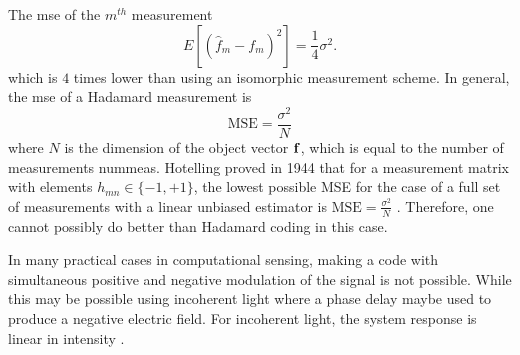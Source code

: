 The \gls{mse} of the $m^{th}$ measurement  
\begin{equation}
	E [ ( \hat{f}_{m} - {f}_{m} )^2 ] = \frac{1}{4} \sigma^2.
\end{equation}
which is $4$ times lower than using an isomorphic measurement scheme. In general, the \gls{mse} of a Hadamard measurement is 
\begin{equation}
	\text{MSE} = \frac{\sigma^2}{N}
	\label{eq:hadamardmse}
\end{equation}
where $N$ is the dimension of the object vector $\mathbf{f}$, which is equal to the number of measurements \gls{nummeas}. Hotelling proved in 1944 that for a measurement matrix with elements $h_{mn} \in \{-1, +1\}$, the lowest possible MSE for the case of a full set of measurements with a linear unbiased estimator is $\text{MSE} = \frac{\sigma^2}{N}$ \cite{brady2009optical}. Therefore, one cannot possibly do better than Hadamard coding in this case. 

In many practical cases in computational sensing, making a code with simultaneous positive and negative modulation of the signal is not possible. While this may be possible using incoherent light where a phase delay maybe used to produce a negative electric field. For incoherent light, the system response is linear in intensity \cite{goodman2005introduction}. 

